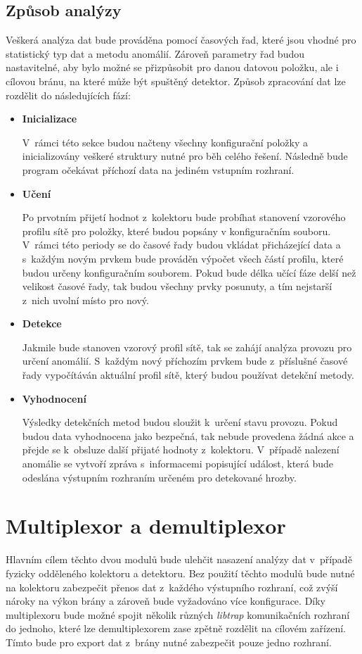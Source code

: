  
 \subsection{Způsob analýzy}
 Veškerá analýza dat bude prováděna pomocí časových řad, které jsou vhodné pro statistický typ 
 dat a metodu anomálií. Zároveň parametry řad budou nastavitelné, aby bylo možné se přizpůsobit
 pro danou datovou položku, ale i cílovou bránu, na které může být spuštěný detektor. Způsob 
 zpracování dat lze rozdělit do následujících fází:
  \begin{itemize}
   \item \textbf{Inicializace}
   
   V~rámci této sekce budou načteny všechny konfigurační položky a inicializovány veškeré struktury
   nutné pro běh celého řešení. Následně bude program očekávat příchozí data na jediném vstupním
   rozhraní.
   
   \item \textbf{Učení}
   
   Po prvotním přijetí hodnot z~kolektoru bude probíhat stanovení vzorového profilu sítě pro položky,
   které budou popsány v konfiguračním souboru. V~rámci
   této periody se do časové řady budou vkládat přicházející data a s~každým novým prvkem 
   bude prováděn výpočet všech částí profilu, které budou určeny konfiguračním souborem.
   Pokud bude délka učící fáze delší než velikost 
   časové řady, tak budou všechny prvky posunuty, a tím nejstarší z~nich uvolní místo pro nový.
   
   \item \textbf{Detekce}
   
   Jakmile bude stanoven vzorový profil sítě, tak se zahájí analýza provozu pro určení anomálií.
   S~každým nový příchozím prvkem bude z~příslušné časové řady vypočítáván aktuální profil sítě,
   který budou používat detekční metody.
   \newpage
   \item \textbf{Vyhodnocení}
   
   Výsledky detekčních metod budou sloužit k~určení stavu provozu. Pokud budou data vyhodnocena jako
   bezpečná, tak nebude provedena žádná akce a přejde se k~obsluze další přijaté hodnoty z~kolektoru.
   V~případě nalezení anomálie se vytvoří zpráva s~informacemi popisující událost, která bude 
   odeslána výstupním rozhraním určeném pro detekované hrozby.   
  \end{itemize}
  
  \newpage
 \section{Multiplexor a demultiplexor}
 Hlavním cílem těchto dvou modulů bude ulehčit nasazení analýzy dat v~případě fyzicky odděleného
 kolektoru a detektoru. Bez použití těchto modulů bude nutné na kolektoru zabezpečit přenos dat
 z~každého výstupního rozhraní, což zvýší nároky na výkon brány a zároveň bude vyžadováno
 více konfigurace. Díky multiplexoru bude možné spojit několik různých \textit{libtrap} komunikačních 
 rozhraní do jednoho, které lze demultiplexorem zase zpětně rozdělit na cílovém zařízení.
 Tímto bude pro export dat z~brány nutné zabezpečit pouze jedno rozhraní.

